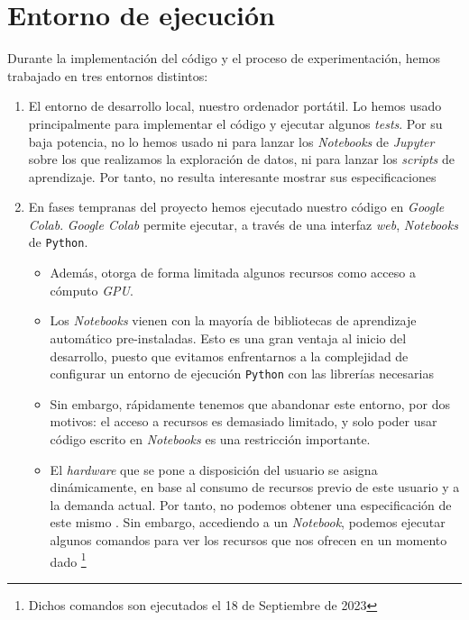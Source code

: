 \section{Entorno de ejecución}

Durante la implementación del código y el proceso de experimentación, hemos trabajado en tres entornos distintos:

\begin{enumerate}
    \item El entorno de desarrollo local, nuestro ordenador portátil. Lo hemos usado principalmente para implementar el código y ejecutar algunos \textit{tests}. Por su baja potencia, no lo hemos usado ni para lanzar los \textit{Notebooks} de \textit{Jupyter} sobre los que realizamos la exploración de datos, ni para lanzar los \textit{scripts} de aprendizaje. Por tanto, no resulta interesante mostrar sus especificaciones

    \item En fases tempranas del proyecto hemos ejecutado nuestro código en \textit{Google Colab}. \textit{Google Colab} permite ejecutar, a través de una interfaz \textit{web}, \textit{Notebooks} de \lstinline{Python}.

        \begin{itemize}
            \item Además, otorga de forma limitada algunos recursos como acceso a cómputo \textit{GPU}.

            \item Los \textit{Notebooks} vienen con la mayoría de bibliotecas de aprendizaje automático pre-instaladas. Esto es una gran ventaja al inicio del desarrollo, puesto que evitamos enfrentarnos a la complejidad de configurar un entorno de ejecución \lstinline{Python} con las librerías necesarias

            \item Sin embargo, rápidamente tenemos que abandonar este entorno, por dos motivos: el acceso a recursos es demasiado limitado, y solo poder usar código escrito en \textit{Notebooks} es una restricción importante.

            \item El \textit{hardware} que se pone a disposición del usuario se asigna dinámicamente, en base al consumo de recursos previo de este usuario y a la demanda actual. Por tanto, no podemos obtener una especificación de este mismo \cite{informatica:google_colab_faq}. Sin embargo, accediendo a un \textit{Notebook}, podemos ejecutar algunos comandos para ver los recursos que nos ofrecen en un momento dado \footnote{Dichos comandos son ejecutados el 18 de Septiembre de 2023}


\end{itemize}
\end{enumerate}
